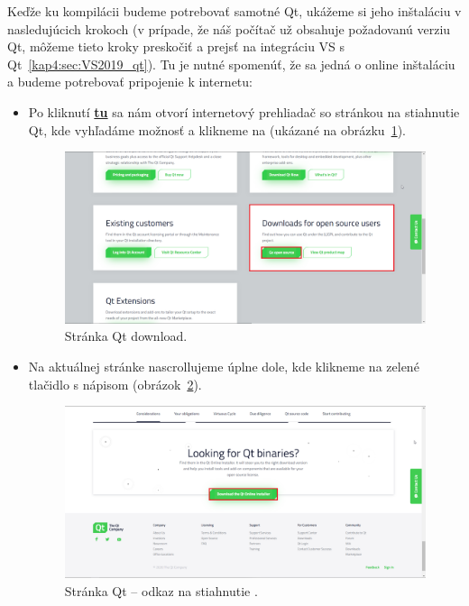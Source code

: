 Keďže ku kompilácii budeme potrebovať samotné Qt, ukážeme si jeho inštaláciu v nasledujúcich krokoch (v prípade, že náš počítač už obsahuje požadovanú verziu Qt, môžeme tieto kroky preskočiť a prejsť na integráciu VS s Qt~\ref{kap4:sec:VS2019_qt}). Tu je nutné spomenúť, že sa jedná o online inštaláciu a budeme potrebovať pripojenie k internetu:
\begin{itemize}
\item Po kliknutí  \href{https://www.qt.io/download}{\textbf{tu}} sa nám otvorí internetový prehliadač so stránkou na stiahnutie Qt, kde vyhľadáme možnosť  a klikneme na  (ukázané na obrázku~\ref{obr:kap4:qt_download}).

\begin{figure}[!htb]
	\centering
	\includegraphics[width=12cm]{img/kap04_qt_download}
	\caption{Stránka Qt download.}
	\label{obr:kap4:qt_download}
\end{figure}

\item Na aktuálnej stránke nascrollujeme úplne dole, kde klikneme na zelené tlačidlo s nápisom  (obrázok~\ref{obr:kap4:qt_online}).

\begin{figure}[!htb]
	\centering
	\includegraphics[width=12cm]{img/kap04_qt_online}
	\caption{Stránka Qt -- odkaz na stiahnutie .}
	\label{obr:kap4:qt_online}
\end{figure}


\end{itemize}
